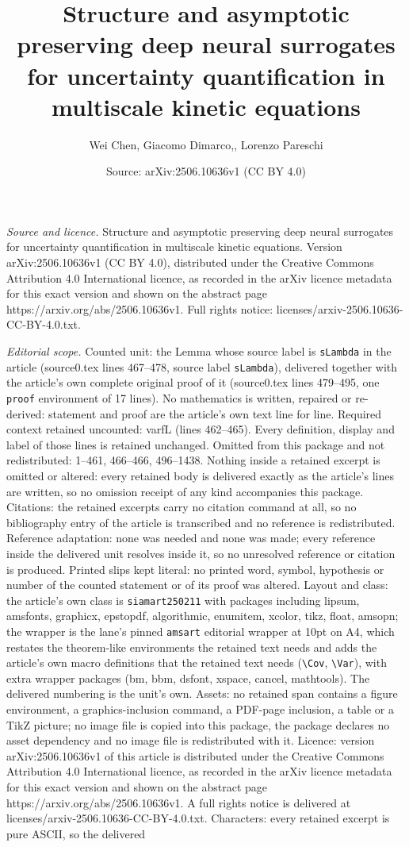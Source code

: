 \documentclass[10pt,a4paper]{amsart}
\title[Structure and asymptotic preserving deep neural surrogates f]{Structure and asymptotic preserving deep neural surrogates for uncertainty quantification in multiscale kinetic equations}
\author{Wei Chen, Giacomo Dimarco,, Lorenzo Pareschi}
\date{Source: arXiv:2506.10636v1 (CC BY 4.0)}
\begin{document}
\maketitle

\noindent\emph{Source and licence.} Structure and asymptotic preserving deep neural surrogates for uncertainty quantification in multiscale kinetic equations. Version arXiv:2506.10636v1 (CC BY 4.0), distributed under the Creative Commons Attribution 4.0 International licence, as recorded in the arXiv licence metadata for this exact version and shown on the abstract page https://arxiv.org/abs/2506.10636v1. Full rights notice: licenses/arxiv-2506.10636-CC-BY-4.0.txt.\par\smallskip

\noindent\textit{Editorial scope.} Counted unit: the Lemma whose source label is \texttt{sLambda} in the article (source0.tex lines 467--478, source label \texttt{sLambda}), delivered together with the article's own complete original proof of it (source0.tex lines 479--495, one \texttt{proof} environment of 17 lines). No mathematics is written, repaired or re-derived: statement and proof are the article's own text line for line. Required context retained uncounted: varfL (lines 462--465). Every definition, display and label of those lines is retained unchanged. Omitted from this package and not redistributed: 1--461, 466--466, 496--1438. Nothing inside a retained excerpt is omitted or altered: every retained body is delivered exactly as the article's lines are written, so no omission receipt of any kind accompanies this package. Citations: the retained excerpts carry no citation command at all, so no bibliography entry of the article is transcribed and no reference is redistributed. Reference adaptation: none was needed and none was made; every reference inside the delivered unit resolves inside it, so no unresolved reference or citation is produced. Printed slips kept literal: no printed word, symbol, hypothesis or number of the counted statement or of its proof was altered. Layout and class: the article's own class is \texttt{siamart250211} with packages including lipsum, amsfonts, graphicx, epstopdf, algorithmic, enumitem, xcolor, tikz, float, amsopn; the wrapper is the lane's pinned \texttt{amsart} editorial wrapper at 10pt on A4, which restates the theorem-like environments the retained text needs and adds the article's own macro definitions that the retained text needs (\texttt{\textbackslash Cov}, \texttt{\textbackslash Var}), with extra wrapper packages (bm, bbm, dsfont, xspace, cancel, mathtools). The delivered numbering is the unit's own. Assets: no retained span contains a figure environment, a graphics-inclusion command, a PDF-page inclusion, a table or a TikZ picture; no image file is copied into this package, the package declares no asset dependency and no image file is redistributed with it. Licence: version arXiv:2506.10636v1 of this article is distributed under the Creative Commons Attribution 4.0 International licence, as recorded in the arXiv licence metadata for this exact version and shown on the abstract page https://arxiv.org/abs/2506.10636v1. A full rights notice is delivered at licenses/arxiv-2506.10636-CC-BY-4.0.txt. Characters: every retained excerpt is pure ASCII, so the delivered 
\end{document}
